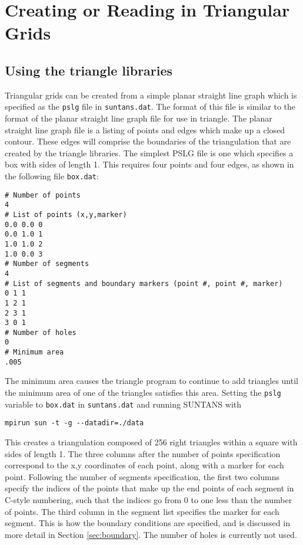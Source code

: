 \section{Creating or Reading in Triangular Grids} \label{sec:grids}

\subsection{Using the triangle libraries} \label{sec:tri}

Triangular grids can be created from a simple planar straight line
graph which is specified as the \verb+pslg+ file in \verb+suntans.dat+.
The format of this file is similar to the format of the planar straight
line graph file for use in triangle.  The planar straight line graph
file is a listing of points and edges which make up a closed contour.
These edges will comprise the boundaries of the triangulation that are
created by the triangle libraries.  The simplest PSLG file is one which
specifies a box with sides of length 1.  This requires four points and
four edges, as shown in the following file \verb+box.dat+:
\begin{verbatim}
# Number of points
4
# List of points (x,y,marker)
0.0 0.0 0
0.0 1.0 1
1.0 1.0 2
1.0 0.0 3
# Number of segments
4
# List of segments and boundary markers (point #, point #, marker)
0 1 1
1 2 1
2 3 1
3 0 1
# Number of holes
0
# Minimum area
.005
\end{verbatim}
The minimum area causes the triangle program to continue to add triangles
until the minimum area of one of the triangles satisfies this area.  
Setting the \verb+pslg+ variable to \verb+box.dat+ in \verb+suntans.dat+
and running SUNTANS with
\begin{verbatim}
mpirun sun -t -g --datadir=./data
\end{verbatim}
This creates a triangulation composed of 256 right triangles within a square
with sides of length 1.  The three columns after the number of points
specification correspond to the x,y coordinates of each point, along
with a marker for each point.  Following the number of segments specification,
the first two columns specify the indices of the points that make up
the end points of each segment in C-style numbering, such that the indices
go from 0 to one less than the number of points.  The third column in the
segment list specifies the marker for each segment.  This is how the boundary
conditions are specified, and is discussed in more detail in Section \ref{sec:boundary}.
The number of holes is currently not used.

